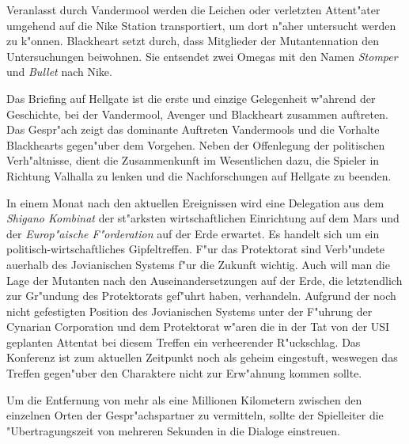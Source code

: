 Veranlasst durch Vandermool werden die Leichen oder verletzten Attent"ater umgehend auf die Nike Station transportiert, um dort n"aher untersucht werden zu k"onnen. Blackheart setzt durch, dass Mitglieder der Mutantennation den Untersuchungen beiwohnen. Sie entsendet zwei Omegas mit den Namen \emph{Stomper} und \emph{Bullet} nach Nike.

\begin{remarks}
	Das Briefing auf Hellgate ist die erste und einzige Gelegenheit w"ahrend der Geschichte, bei der Vandermool, Avenger und Blackheart zusammen auftreten. Das Gespr"ach zeigt das dominante Auftreten Vandermools und die Vorhalte Blackhearts gegen"uber dem Vorgehen. Neben der Offenlegung der politischen Verh"altnisse, dient die Zusammenkunft im Wesentlichen dazu, die Spieler in Richtung Valhalla zu lenken und die Nachforschungen auf Hellgate zu beenden.

	In einem Monat nach den aktuellen Ereignissen wird eine Delegation aus dem \emph{Shigano Kombinat} der st"arksten wirtschaftlichen Einrichtung auf dem Mars und der \emph{Europ"aische F"orderation} auf der Erde erwartet. Es handelt sich um ein politisch-wirtschaftliches Gipfeltreffen. F"ur das Protektorat sind Verb"undete au\3erhalb des Jovianischen Systems f"ur die Zukunft wichtig. Auch will man die Lage der Mutanten nach den Auseinandersetzungen auf der Erde, die letztendlich zur Gr"undung des Protektorats gef"uhrt haben, verhandeln. Aufgrund der noch nicht gefestigten Position des Jovianischen Systems unter der F"uhrung der Cynarian Corporation und dem Protektorat w"aren die in der Tat von der USI geplanten Attentat bei diesem Treffen ein verheerender R"uckschlag. Das Konferenz ist zum aktuellen Zeitpunkt noch als geheim eingestuft, weswegen das Treffen gegen"uber den Charaktere nicht zur Erw"ahnung kommen sollte.

	Um die Entfernung von mehr als eine Millionen Kilometern zwischen den einzelnen Orten der Gespr"achspartner zu vermitteln, sollte der Spielleiter die "Ubertragungszeit von mehreren Sekunden in die Dialoge einstreuen.
\end{remarks}

